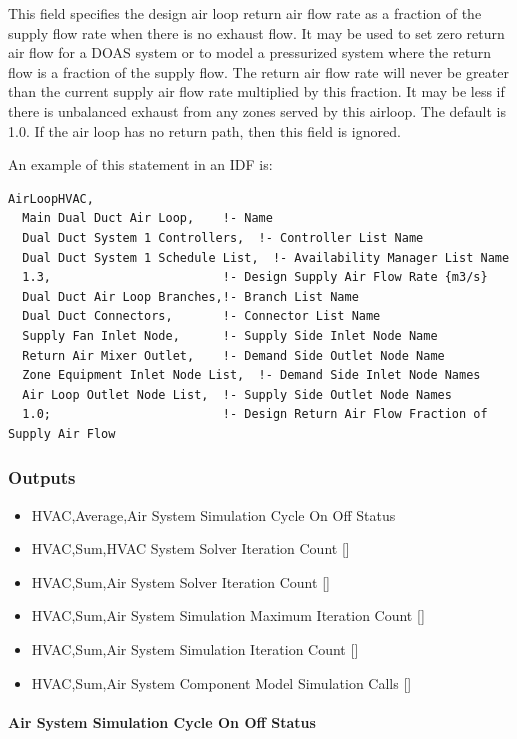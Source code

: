 This field specifies the design air loop return air flow rate as a fraction of the supply flow rate when there is no exhaust flow.  It may be used to set zero return air flow for a DOAS system or to model a pressurized system where the return flow is a fraction of the supply flow. The return air flow rate will never be greater than the current supply air flow rate multiplied by this fraction.  It may be less if there is unbalanced exhaust from any zones served by this airloop. The default is 1.0. If the air loop has no return path, then this field is ignored.

An example of this statement in an IDF is:

\begin{lstlisting}
AirLoopHVAC,
  Main Dual Duct Air Loop,    !- Name
  Dual Duct System 1 Controllers,  !- Controller List Name
  Dual Duct System 1 Schedule List,  !- Availability Manager List Name
  1.3,                        !- Design Supply Air Flow Rate {m3/s}
  Dual Duct Air Loop Branches,!- Branch List Name
  Dual Duct Connectors,       !- Connector List Name
  Supply Fan Inlet Node,      !- Supply Side Inlet Node Name
  Return Air Mixer Outlet,    !- Demand Side Outlet Node Name
  Zone Equipment Inlet Node List,  !- Demand Side Inlet Node Names
  Air Loop Outlet Node List,  !- Supply Side Outlet Node Names
  1.0;                        !- Design Return Air Flow Fraction of Supply Air Flow
\end{lstlisting}

\subsubsection{Outputs}\label{outputs-001}

\begin{itemize}
\item
  HVAC,Average,Air System Simulation Cycle On Off Status
\item
  HVAC,Sum,HVAC System Solver Iteration Count {[]}
\item
  HVAC,Sum,Air System Solver Iteration Count {[]}
\item
  HVAC,Sum,Air System Simulation Maximum Iteration Count {[]}
\item
  HVAC,Sum,Air System Simulation Iteration Count {[]}
\item
  HVAC,Sum,Air System Component Model Simulation Calls {[]}
\end{itemize}

\paragraph{Air System Simulation Cycle On Off Status}\label{air-system-simulation-cycle-on-off-status}

